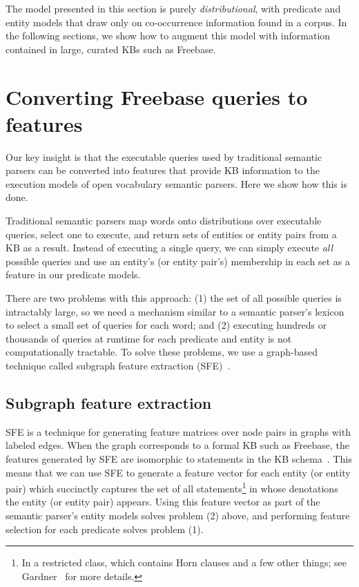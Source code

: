 \documentclass[11pt,letterpaper]{article}
\begin{document}
The model presented in this section is purely \emph{distributional}, with predicate and entity
models that draw only on co-occurrence information found in a corpus.  In the following sections,
we show how to augment this model with information contained in large, curated KBs such as
Freebase.

\section{Converting Freebase queries to features}
\label{sec:queries-as-features}

Our key insight is that the executable queries used by traditional semantic parsers can be
converted into features that provide KB information to the execution models of open vocabulary
semantic parsers.  Here we show how this is done.

Traditional semantic parsers map words onto distributions over executable queries, select one to
execute, and return sets of entities or entity pairs from a KB as a result.  Instead of executing a
single query, we can simply execute \emph{all} possible queries and use an entity's (or entity
pair's) membership in each set as a feature in our predicate models.

There are two problems with this approach: (1) the set of all possible queries is intractably
large, so we need a mechanism similar to a semantic parser's lexicon to select a small set of
queries for each word; and (2) executing hundreds or thousands of queries at runtime for each
predicate and entity is not computationally tractable.  To solve these problems, we use a
graph-based technique called subgraph feature extraction (SFE)~\cite{gardner-2015-sfe}.

\subsection{Subgraph feature extraction}

SFE is a technique for generating feature matrices over node pairs in graphs with labeled edges.
When the graph corresponds to a formal KB such as Freebase, the features generated by SFE are
isomorphic to statements in the KB schema~\cite{gardner-2015-thesis}.  This means that we can use
SFE to generate a feature vector for each entity (or entity pair) which succinctly captures the set
of all statements\footnote{In a restricted class, which contains Horn clauses and a few other
things; see Gardner~ for more details.} in whose denotations the entity
(or entity pair) appears.  Using this feature vector as part of the semantic parser's entity models
solves problem (2) above, and performing feature selection for each predicate solves problem (1).
\end{document}
